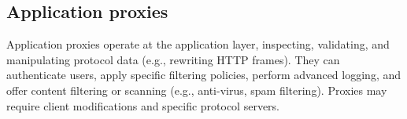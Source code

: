 \subsection{Application proxies}
Application proxies operate at the application layer, inspecting, validating, and manipulating protocol data (e.g., rewriting HTTP frames). 
They can authenticate users, apply specific filtering policies, perform advanced logging, and offer content filtering or scanning (e.g., anti-virus, spam filtering). 
Proxies may require client modifications and specific protocol servers.
